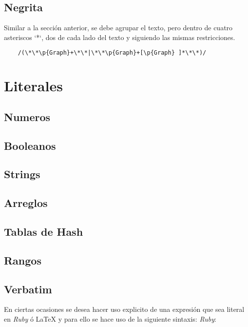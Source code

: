 \documentclass[12pt,letterpaper,titlepage,oneside,openright]{book}
\newcommand{\latex}{\LaTeX\xspace}
\newcommand{\ruby}{\textit{Ruby}\xspace}
\begin{document}
\subsection{Negrita}

Similar a la sección anterior, se debe agrupar el texto, pero dentro de cuatro
asteriscos `*`, dos de cada lado del texto y siguiendo las mismas restricciones.

\begin{center}
\begin{verbatim}
    /(\*\*\p{Graph}+\*\*|\*\*\p{Graph}+[\p{Graph} ]*\*\*)/
\end{verbatim}
\end{center}

\section{Literales}

\subsection{Numeros}

\subsection{Booleanos}

\subsection{Strings}

\subsection{Arreglos}

\subsection{Tablas de Hash}

\subsection{Rangos}

\subsection{Verbatim}

En ciertas ocasiones se desea hacer uso explicito de una expresión que sea
literal en \ruby ó \latex y para ello se hace uso de la siguiente sintaxis:
 \ruby:
\end{document}
